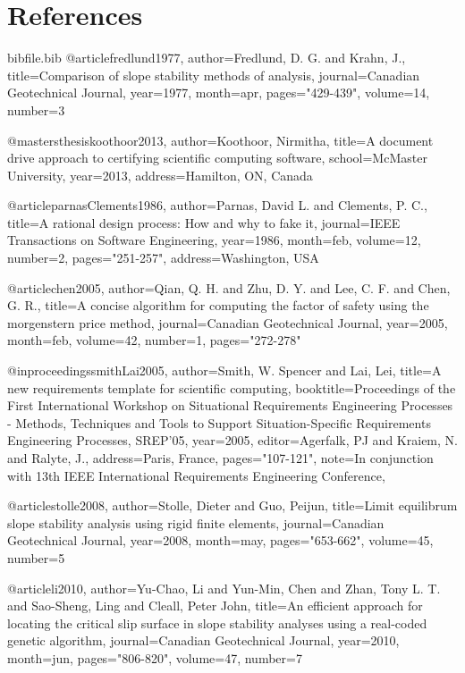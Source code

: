 \documentclass[12pt]{article}
\begin{document}
\section{References}
\label{Sec:References}
\begin{filecontents*}{bibfile.bib}
@article{fredlund1977,
author={Fredlund, D. G. and Krahn, J.},
title={Comparison of slope stability methods of analysis},
journal={Canadian Geotechnical Journal},
year={1977},
month={apr},
pages={"429-439"},
volume={14},
number={3}}

@mastersthesis{koothoor2013,
author={Koothoor, Nirmitha},
title={A document drive approach to certifying scientific computing software},
school={McMaster University},
year={2013},
address={Hamilton, ON, Canada}}

@article{parnasClements1986,
author={Parnas, David L. and Clements, P. C.},
title={A rational design process: How and why to fake it},
journal={IEEE Transactions on Software Engineering},
year={1986},
month={feb},
volume={12},
number={2},
pages={"251-257"},
address={Washington, USA}}

@article{chen2005,
author={Qian, Q. H. and Zhu, D. Y. and Lee, C. F. and Chen, G. R.},
title={A concise algorithm for computing the factor of safety using the morgenstern price method},
journal={Canadian Geotechnical Journal},
year={2005},
month={feb},
volume={42},
number={1},
pages={"272-278"}}

@inproceedings{smithLai2005,
author={Smith, W. Spencer and Lai, Lei},
title={A new requirements template for scientific computing},
booktitle={Proceedings of the First International Workshop on Situational Requirements Engineering Processes - Methods, Techniques and Tools to Support Situation-Specific Requirements Engineering Processes, SREP'05},
year={2005},
editor={Agerfalk, PJ and Kraiem, N. and Ralyte, J.},
address={Paris, France},
pages={"107-121"},
note={In conjunction with 13th IEEE International Requirements Engineering Conference,}}

@article{stolle2008,
author={Stolle, Dieter and Guo, Peijun},
title={Limit equilibrum slope stability analysis using rigid finite elements},
journal={Canadian Geotechnical Journal},
year={2008},
month={may},
pages={"653-662"},
volume={45},
number={5}}

@article{li2010,
author={Yu-Chao, Li and Yun-Min, Chen and Zhan, Tony L. T. and Sao-Sheng, Ling and Cleall, Peter John},
title={An efficient approach for locating the critical slip surface in slope stability analyses using a real-coded genetic algorithm},
journal={Canadian Geotechnical Journal},
year={2010},
month={jun},
pages={"806-820"},
volume={47},
number={7}}
\end{filecontents*}
\nocite{*}
\printbibliography[heading=none]
\end{document}
